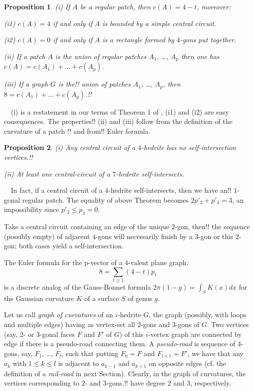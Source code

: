 \documentclass[12pt]{article}
\newtheorem{proposition}{Proposition}
\newcommand{\proof}{\noindent{\bf Proof.}\ \ }
\begin{document}
\begin{proposition}\label{Local-Euler-Formula}
(i) If $A$ be a regular patch, then $c(A)=4-t$, moreover:

(i1) $c(A)=4$ if and only if $A$ is bounded by a simple central circuit.

(i2) $c(A)=0$ if and only if $A$ is a rectangle formed by $4$-gons put 
together.

(ii) If a patch $A$ is the union of regular patches $A_1$, \dots, $A_p$ then one has $c(A)=c(A_1)+\dots+c(A_p)$.

(iii) If a graph $G$ is the!! union of patches $A_1$, \dots, $A_p$, then $8=c(A_1)+\dots+c(A_p)$.!!
\end{proposition}
\proof (i) is a restatement in our terms of Theorem 1 of \cite{DSt}, (i1) and (i2) are easy consequences. The properties!! (ii) and (iii) follow from the definition of the curvature of a patch !! and from!! Euler formula.






\begin{proposition}
(i) Any central circuit of a $4$-hedrite has no self-intersection vertices.!!

(ii) At least one central-circuit of a $7$-hedrite self-intersects.
\end{proposition}
\proof In fact, if a central circuit of a $4$-hedrite self-intersects, then we have an!! $1$-gonal regular patch. The equality of above Theorem becomes $2p'_2+p'_3=3$, an impossibility since $p'_3\leq p_3=0$.

Take a central circuit containing an edge of the unique $2$-gon, then!! the sequence (possibly empty) of adjacent $4$-gons will necessarily finish by a $3$-gon or this $2$-gon; both cases yield a self-intersection.






The Euler formula for the p-vector of a $4$-valent plane graph:
$$8=\sum_{t\geq 1} (4-t)p_t$$
is a discrete analog of the Gauss-Bonnet formula $2\pi(1-g)=\int_{S} K(x)dx$ for the Gaussian curvature $K$ of a surface $S$ of genus $g$. 

Let us call {\em graph of curvatures} of an $i$-hedrite $G$, the
graph (possibly, with loops and multiple edges) having as vertex-set
all $2$-gons and $3$-gons of $G$. 
Two vertices (say, $2$- or $3$-gonal faces $F$ and $F'$ of $G$) of 
this $i$-vertex graph are connected by edge if there is a pseudo-road 
connecting them. A {\em pseudo-road} is sequence of $4$-gons, say,
$F_1$, \dots, $F_l$, such that putting $F_0=F$ and $F_{l+1}=F'$, 
we have that any $a_k$ with $1\leq k\leq l$ is adjacent to $a_{k-1}$ 
and $a_{k+1}$ on opposite edges (cf. the definition of
a {\em rail-road} in next Section). Clearly, in the graph of curvatures, 
the vertices corresponding to $2$- and $3$-gons,!! have degree $2$ and $3$, 
respectively.
\end{document}
